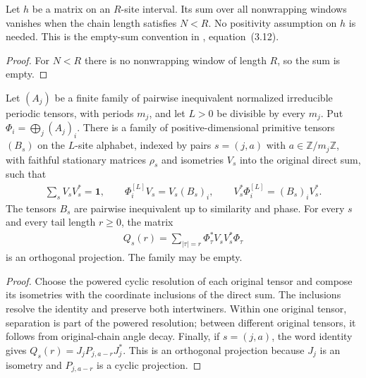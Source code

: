 \begin{lemma}
    \label{thm:all_length_open_interaction_matrix}
    \leanok
    Let $h$ be a matrix on an $R$-site interval. Its sum over all
    nonwrapping windows vanishes when the chain length satisfies $N<R$.
    No positivity assumption on $h$ is needed.
    This is the empty-sum convention in \cite{Nachtergaele1996Spectral},
    equation~\textup{(3.12)}.
\end{lemma}
\begin{proof}\leanok
    For $N<R$ there is no nonwrapping window of length $R$, so the sum
    is empty.
\end{proof}

\begin{lemma}
    \label{thm:periodic_family_literal_primitive_resolution}
    \leanok
    Let $(A_j)$ be a finite family of pairwise inequivalent normalized
    irreducible periodic tensors, with periods $m_j$, and let $L>0$ be divisible
    by every $m_j$. Put $\Phi_i=\bigoplus_j(A_j)_i$. There is a family of
    positive-dimensional primitive tensors $(B_s)$ on the $L$-site alphabet,
    indexed by pairs $s=(j,a)$ with $a\in\mathbb Z/m_j\mathbb Z$, with faithful
    stationary matrices $\rho_s$ and isometries $V_s$ into the original direct sum,
    such that
    \begin{align}
        \sum_sV_sV_s^*=\mathbf1,\qquad
        \Phi^{[L]}_iV_s=V_s(B_s)_i,\qquad
        V_s^*\Phi^{[L]}_i=(B_s)_iV_s^*.
    \end{align}
    The tensors $B_s$ are pairwise inequivalent up to similarity and phase.
    For every $s$ and every tail length $r\geq0$, the matrix
    \begin{align}
        Q_s(r)=\sum_{|\tau|=r}\Phi_\tau^*V_sV_s^*\Phi_\tau
    \end{align}
    is an orthogonal projection. The family may be empty.
\end{lemma}
\begin{proof}\leanok
    Choose the powered cyclic resolution of each original tensor and
    compose its isometries with the coordinate inclusions of the direct sum.
    The inclusions resolve the identity and preserve both intertwiners.
    Within one original tensor, separation is part of the powered resolution;
    between different original tensors, it follows from original-chain angle
    decay. Finally, if $s=(j,a)$, the word identity gives
    $Q_s(r)=J_jP_{j,a-r}J_j^*$. This is an orthogonal projection because $J_j$
    is an isometry and $P_{j,a-r}$ is a cyclic projection.
\end{proof}

